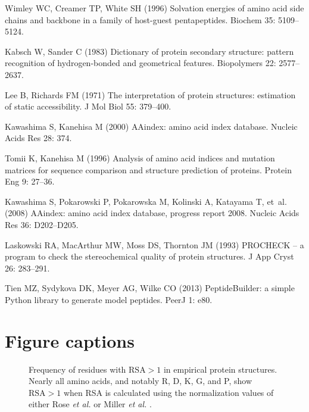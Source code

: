 \documentclass[11pt]{article}
\begin{document}
\begin{thebibliography}{10}
Wimley WC, Creamer TP, White SH (1996) Solvation energies of amino acid side
  chains and backbone in a family of host-guest pentapeptides.
\newblock Biochem 35: 5109--5124.

Kabsch W, Sander C (1983) Dictionary of protein secondary structure: pattern
  recognition of hydrogen-bonded and geometrical features.
\newblock Biopolymers 22: 2577--2637.

Lee B, Richards FM (1971) The interpretation of protein structures: estimation
  of static accessibility.
\newblock J Mol Biol 55: 379--400.

Kawashima S, Kanehisa M (2000) {AAindex:} amino acid index database.
\newblock Nucleic Acids Res 28: 374.

Tomii K, Kanehisa M (1996) Analysis of amino acid indices and mutation matrices
  for sequence comparison and structure prediction of proteins.
\newblock Protein Eng 9: 27--36.

Kawashima S, Pokarowski P, Pokarowska M, Kolinski A, Katayama T, et~al. (2008)
  {AAindex:} amino acid index database, progress report 2008.
\newblock Nucleic Acids Res 36: D202--D205.

Laskowski RA, MacArthur MW, Moss DS, Thornton JM (1993) {PROCHECK} -- a program
  to check the stereochemical quality of protein structures.
\newblock J App Cryst 26: 283--291.

Tien MZ, Sydykova DK, Meyer AG, Wilke CO (2013) {PeptideBuilder:} a simple
  {Python} library to generate model peptides.
\newblock PeerJ 1: e80.

\end{thebibliography}

\newpage

\section*{Figure captions}

\begin{figure}[H]
\caption{\label{fig:BarGraphRSA}Frequency of residues with $\text{RSA}>1$ in empirical protein structures. Nearly all amino acids, and notably R, D, K, G, and P, show $\text{RSA}>1$ 
when RSA is calculated using the normalization values of either Rose \emph{et al.} \cite{Rose1985} or Miller \emph{et al.} \cite{Miller1987}.}
\end{figure}
\end{document}

